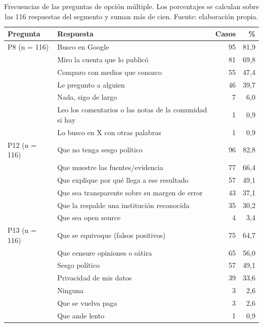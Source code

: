 \begin{table}[t]
  \centering\small
  \caption{Frecuencias de las preguntas de opción múltiple. Los porcentajes se calculan sobre las 116 respuestas del segmento y suman más de cien. Fuente: elaboración propia.}
  \label{tab:enc-multiple}
  \begin{tabular}{l >{\raggedright\arraybackslash}p{8.4cm} rr}
    \hline
    \textbf{Pregunta} & \textbf{Respuesta} & \textbf{Casos} & \textbf{\%} \\
    \hline
    P8 (n = 116) & Busco en Google & 95 & 81,9 \\
     & Miro la cuenta que lo publicó & 81 & 69,8 \\
     & Comparo con medios que conozco & 55 & 47,4 \\
     & Le pregunto a alguien & 46 & 39,7 \\
     & Nada, sigo de largo & 7 & 6,0 \\
     & Leo los comentarios o las notas de la comunidad si hay & 1 & 0,9 \\
     & Lo busco en X con otras palabras & 1 & 0,9 \\
    \hline
    P12 (n = 116) & Que no tenga sesgo político & 96 & 82,8 \\
     & Que muestre las fuentes/evidencia & 77 & 66,4 \\
     & Que explique por qué llega a ese resultado & 57 & 49,1 \\
     & Que sea transparente sobre su margen de error & 43 & 37,1 \\
     & Que la respalde una institución reconocida & 35 & 30,2 \\
     & Que sea open source & 4 & 3,4 \\
    \hline
    P13 (n = 116) & Que se equivoque (falsos positivos) & 75 & 64,7 \\
     & Que censure opiniones o sátira & 65 & 56,0 \\
     & Sesgo político & 57 & 49,1 \\
     & Privacidad de mis datos & 39 & 33,6 \\
     & Ninguna & 3 & 2,6 \\
     & Que se vuelva paga & 3 & 2,6 \\
     & Que ande lento & 1 & 0,9 \\
    \hline
  \end{tabular}
\end{table}

